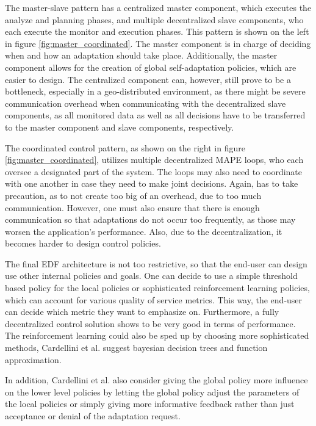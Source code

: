         \quad The master-slave pattern has a centralized master component, which executes the analyze and planning phases, and multiple decentralized slave components, 
        who each execute the monitor and execution phases. This pattern is shown on the left in figure \ref{fig:master_coordinated}.
        The master component is in charge of deciding when and how an adaptation should take place.
        Additionally, the master component allows for the creation of global self-adaptation policies, which are easier to design.
        The centralized component can, however, still prove to be a bottleneck, especially in a geo-distributed environment, as there might be severe communication overhead when communicating 
        with the decentralized slave components, as all monitored data as well as all decisions have to be transferred to the master component and slave components, respectively. 

        \quad The coordinated control pattern, as shown on the right in figure \ref{fig:master_coordinated}, utilizes multiple decentralized MAPE loops, who each oversee a designated part of the system. 
        The loops may also need to coordinate with one another in case they need to make joint decisions. Again, has to take precaution, as to not create too big of an overhead, due to too much communication.
        However, one must also ensure that there is enough communication so that adaptations do not occur too frequently, as those may worsen the application's performance.
        Also, due to the decentralization, it becomes harder to design control policies.
        
        \quad The final EDF architecture is not too restrictive, so that the end-user can design use other internal policies and goals. 
        One can decide to use a simple threshold based policy for the local policies or sophisticated reinforcement learning policies, which can account for various 
        quality of service metrics. This way, the end-user can decide which metric they want to emphasize on.
        Furthermore, a fully decentralized control solution shows to be very good in terms of performance.
        The reinforcement learning could also be sped up by choosing more sophisticated methods, Cardellini et al. suggest bayesian decision trees and function approximation.

        \quad In addition, Cardellini et al. also consider giving the global policy more influence on the lower level policies by letting the 
        global policy adjust the parameters of the local policies or simply giving more informative feedback rather than just acceptance or denial of the adaptation request.



